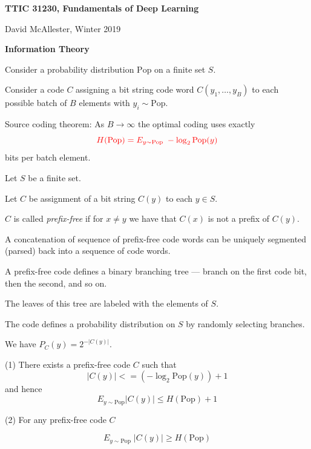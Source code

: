 




{\Huge

  \centerline{\bf TTIC 31230, Fundamentals of Deep Learning}
  \bigskip
  \centerline{David McAllester, Winter 2019}

  \vfill
  \centerline{\bf Information Theory} 
  \vfill
\vfill
\vfill


Consider a probability distribution $\mathrm{Pop}$ on a finite set $S$.

\vfill
Consider a code $C$ assigning a bit string code word $C(y_1,\ldots,y_B)$ to each possible batch of $B$ elements with $y_i \sim \mathrm{Pop}$.

\vfill
Source coding theorem: As $B \rightarrow \infty$ the optimal coding uses exactly
$${\color{red} H(\mathrm{Pop}) = E_{y\sim \mathrm{Pop}}\; - \log_2 \mathrm{Pop}(y)}$$
bits per batch element.


Let $S$ be a finite set.

\vfill
Let $C$ be assignment of a bit string $C(y)$ to each $y \in S$.

\vfill
$C$ is called {\em prefix-free} if for $x \not = y$ we have that $C(x)$ is not a prefix of $C(y)$.

\vfill
A concatenation of sequence of prefix-free code words can be uniquely segmented (parsed) back into a sequence of code words.


A prefix-free code defines a binary branching tree --- branch on the first code bit, then the second, and so on.

\vfill
The leaves of this tree are labeled with the elements of $S$.

\vfill
The code defines a probability distribution on $S$ by randomly selecting branches.

\vfill
We have $P_C(y) = 2^{-|C(y)|}$.


(1) There exists a prefix-free code $C$ such that
$$|C(y)| <= (- \log_2 \mathrm{Pop}(y)) + 1$$
and hence
$$E_{y\sim \mathrm{Pop}} |C(y)| \leq H(\mathrm{Pop}) +1$$

\vfill
(2) For any prefix-free code $C$

$$E_{y \sim \mathrm{Pop}}\;|C(y)| \geq H(\mathrm{Pop})$$

}
